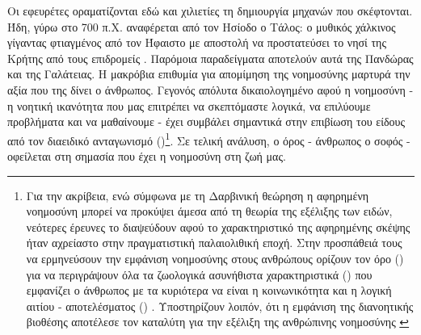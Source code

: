 Οι εφευρέτες οραματίζονται εδώ και χιλιετίες τη δημιουργία μηχανών που σκέφτονται. Ήδη, γύρω στο 700 π.Χ. αναφέρεται από τον Ησίοδο ο Τάλος: ο μυθικός χάλκινος γίγαντας φτιαγμένος από τον Ήφαιστο με αποστολή να προστατεύσει το νησί της Κρήτης από τους επιδρομείς \cite{mayor2020gods}. Παρόμοια παραδείγματα αποτελούν αυτά της Πανδώρας και της Γαλάτειας. Η μακρόβια επιθυμία για απομίμηση της νοημοσύνης μαρτυρά την αξία που της δίνει ο άνθρωπος. Γεγονός απόλυτα δικαιολογημένο αφού η νοημοσύνη - η νοητική ικανότητα που μας επιτρέπει να σκεπτόμαστε λογικά, να επιλύουμε προβλήματα και να μαθαίνουμε - έχει συμβάλει σημαντικά στην επιβίωση του είδους από τον διαειδικό ανταγωνισμό ()\footnote{Για την ακρίβεια, ενώ σύμφωνα με τη Δαρβινική θεώρηση η αφηρημένη νοημοσύνη μπορεί να προκύψει άμεσα από τη θεωρία της εξέλιξης των ειδών, νεότερες έρευνες το διαψεύδουν αφού το χαρακτηριστικό της αφηρημένης σκέψης ήταν αχρείαστο στην πραγματιστική παλαιολιθική εποχή. Στην προσπάθειά τους να ερμηνεύσουν την εμφάνιση νοημοσύνης στους ανθρώπους ορίζουν τον όρο  () για να περιγράψουν όλα τα ζωολογικά ασυνήθιστα χαρακτηριστικά () που εμφανίζει ο άνθρωπος με τα κυριότερα να είναι η κοινωνικότητα και η λογική αιτίου - αποτελέσματος () \cite{pinker2010cognitiveniche,tooby1987reconstruction}. Υποστηρίζουν λοιπόν, ότι η εμφάνιση της διανοητικής βιοθέσης αποτέλεσε τον καταλύτη για την εξέλιξη της ανθρώπινης νοημοσύνης \cite{avise2010light}}. Σε τελική ανάλυση, ο όρος  - άνθρωπος ο σοφός - οφείλεται στη σημασία που έχει η νοημοσύνη στη ζωή μας.
\par


